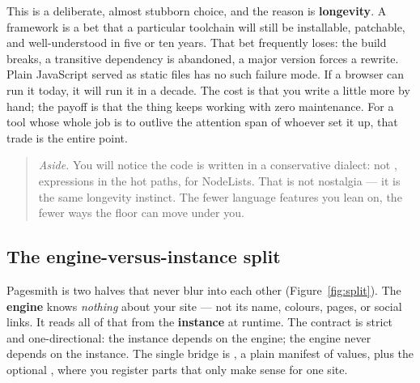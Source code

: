 \documentclass[11pt]{article}
\begin{document}
This is a deliberate, almost stubborn choice, and the reason is
\textbf{longevity}. A framework is a bet that a particular toolchain will still
be installable, patchable, and well-understood in five or ten years. That bet
frequently loses: the build breaks, a transitive dependency is abandoned, a major
version forces a rewrite. Plain JavaScript served as static files has no such
failure mode. If a browser can run it today, it will run it in a decade. The cost
is that you write a little more by hand; the payoff is that the thing keeps
working with zero maintenance. For a tool whose whole job is to outlive the
attention span of whoever set it up, that trade is the entire point.

\begin{quote}
\small\emph{Aside.} You will notice the code is written in a conservative
dialect:  not ,  expressions in the hot paths,
 for NodeLists. That is not nostalgia --- it is the
same longevity instinct. The fewer language features you lean on, the fewer ways
the floor can move under you.
\end{quote}

\subsection{The engine-versus-instance split}

Pagesmith is two halves that never blur into each other (Figure~\ref{fig:split}).
The \textbf{engine} knows \emph{nothing} about your site --- not its name,
colours, pages, or social links. It reads all of that from the \textbf{instance}
at runtime. The contract is strict and one-directional: the instance depends on
the engine; the engine never depends on the instance. The single bridge is
, a plain manifest of values, plus the optional
, where you register parts that only make sense for one site.
\end{document}
